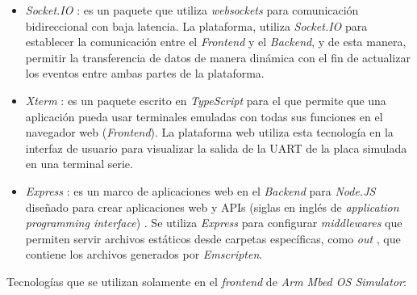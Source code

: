 \begin{itemize}
    \item \textit{Socket.IO} \citep{Socket}: es un paquete que utiliza \textit{websockets} para comunicación bidireccional con baja latencia. La plataforma, utiliza \textit{Socket.IO} para establecer la comunicación entre el \textit{Frontend} y el \textit{Backend}, y de esta manera, permitir la transferencia de datos de manera dinámica con el fin de actualizar los eventos entre ambas partes de la plataforma.

    \item \textit{Xterm} \citep{Xterm}: es un paquete escrito en \textit{TypeScript} \citep{TypeScript} para el que permite que una aplicación pueda usar terminales emuladas con todas sus funciones en el navegador web (\textit{Frontend}). La plataforma web utiliza esta tecnología en la interfaz de usuario para visualizar la salida de la UART de la placa simulada en una terminal serie.

    \item \textit{Express} \citep{Express}: es un marco de aplicaciones web en el \textit{Backend} para \textit{Node.JS} diseñado para crear aplicaciones web y APIs (siglas en inglés de \textit{application programming interface}) \citep{API}. Se utiliza \textit{Express} para configurar \textit{middlewares} que permiten servir archivos estáticos desde carpetas específicas, como \textquotedbl \textit{out} \textquotedbl, que contiene los archivos generados por \textit{Emscripten}.

\end{itemize}

Tecnologías que se utilizan solamente en el \textit{frontend} de \textit{Arm Mbed OS Simulator}:

